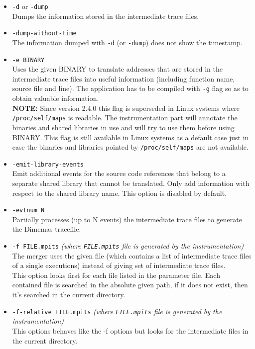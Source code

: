 \begin{itemize}
 \item {\tt -d} or {\tt -dump}\\
 Dumps the information stored in the intermediate trace files.
 \item {\tt -dump-without-time}\\
 The information dumped with {\tt -d} (or {\tt -dump}) does not show the timestamp.
 \item {\tt -e BINARY}\\
 Uses the given BINARY to translate addresses that are stored in the intermediate trace files into useful information (including function name, source file and line). The application has to be compiled with {\tt -g} flag so as to obtain valuable information.\\
 {\bf NOTE:} Since \TRACE version 2.4.0 this flag is superseded in Linux systems where {\tt /proc/self/maps} is readable. The instrumentation part will annotate the binaries and shared libraries in use and will try to use them before using BINARY. This flag is still available in Linux systems as a default case just in case the binaries and libraries pointed by {\tt /proc/self/maps} are not available.
 \item {\tt -emit-library-events}\\
 Emit additional events for the source code references that belong to a separate shared library that cannot be translated. Only add information with respect to the shared library name. This option is disabled by default.
 \item {\tt -evtnum N}\\
 Partially processes (up to N events) the intermediate trace files to generate the Dimemas tracefile.
 \item {\tt -f FILE.mpits} {\em (where {\tt FILE.mpits} file is generated by the instrumentation)}\\
 The merger uses the given file (which contains a list of intermediate trace files of a single executions) instead of giving set of intermediate trace files.\\
 This option looks first for each file listed in the parameter file. Each contained file is searched in the absolute given path, if it does not exist, then it's searched in the current directory.
 \item {\tt -f-relative FILE.mpits} {\em (where {\tt FILE.mpits} file is generated by the instrumentation)}\\
 This options behaves like the -f options but looks for the intermediate files in the current directory.

\end{itemize}

